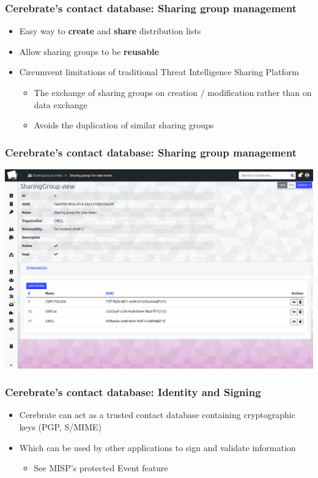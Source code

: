 \begin{frame}
\frametitle{Cerebrate's contact database: Sharing group management}
    \begin{itemize}
        \item Easy way to \textbf{create} and \textbf{share} distribution lists
        \item Allow sharing groups to be \textbf{reusable}
        \item Circumvent limitations of traditional Threat Intelligence Sharing Platform
        \begin{itemize}
            \item The exchange of sharing groups on creation / modification rather than on data exchange
            \item Avoids the duplication of similar sharing groups
        \end{itemize}
    \end{itemize}
\end{frame}

\begin{frame}
\frametitle{Cerebrate's contact database: Sharing group management}
    \begin{center}
        \includegraphics[width=0.9\linewidth]{pictures/sharinggroup.png}
    \end{center}
\end{frame}

\begin{frame}
\frametitle{Cerebrate's contact database: Identity and Signing}
    \begin{itemize}
        \item Cerebrate can act as a trusted contact database containing cryptographic keys (PGP, S/MIME)
        \item Which can be used by other applications to sign and validate information
        \begin{itemize}
            \item See MISP's protected Event feature
        \end{itemize}
    \end{itemize}
\end{frame}

